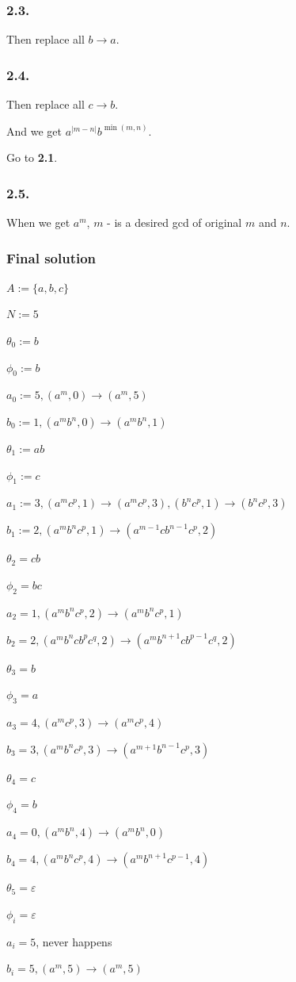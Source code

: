 \documentclass{article}
\begin{document}
\subsubsection*{2.3.}

Then replace all \( b \to a \).

\subsubsection*{2.4.}

Then replace all \( c \to b \).

And we get \( a^{|m-n|}b^{\min(m,n)} \).

Go to \textbf{2.1}.

\subsubsection*{2.5.}

When we get \( a^m \), \( m \) - is a desired gcd of original \( m \) and \( n \).

\subsubsection*{Final solution}

\( A := \{ a, b, c \} \)

\( N := 5 \)

\( \theta_0 := b \)

\( \phi_0 := b \)

\( a_0 := 5, (a^m, 0) \to (a^m, 5) \)

\( b_0 := 1, (a^mb^n, 0) \to (a^mb^n, 1) \)

\( \theta_1 := ab \)

\( \phi_1 := c \)

\( a_1 := 3, (a^mc^p, 1) \to (a^mc^p, 3), (b^nc^p, 1) \to (b^nc^p, 3) \)

\( b_1 := 2, (a^mb^nc^p, 1) \to (a^{m-1}cb^{n-1}c^p, 2) \)

\( \theta_2 = cb \)

\( \phi_2 = bc \)

\( a_2 = 1, (a^mb^nc^p, 2) \to (a^mb^nc^p, 1) \)

\( b_2 = 2, (a^mb^ncb^pc^q, 2) \to (a^mb^{n+1}cb^{p-1}c^q, 2) \)

\( \theta_3 = b \)

\( \phi_3 = a \)

\( a_3 = 4, (a^mc^p, 3) \to (a^mc^p, 4) \)

\( b_3 = 3, (a^mb^nc^p, 3) \to (a^{m + 1}b^{n-1}c^p, 3) \)

\( \theta_4 = c \)

\( \phi_4 = b \)

\( a_4 = 0, (a^mb^n, 4) \to (a^mb^n, 0) \)

\( b_4 = 4, (a^mb^nc^p, 4) \to (a^mb^{n+1}c^{p-1}, 4) \)

\( \theta_5 = \varepsilon \)

\( \phi_i = \varepsilon \)

\( a_i = 5 \), never happens

\( b_i = 5, (a^m, 5) \to (a^m, 5) \)
\end{document}
